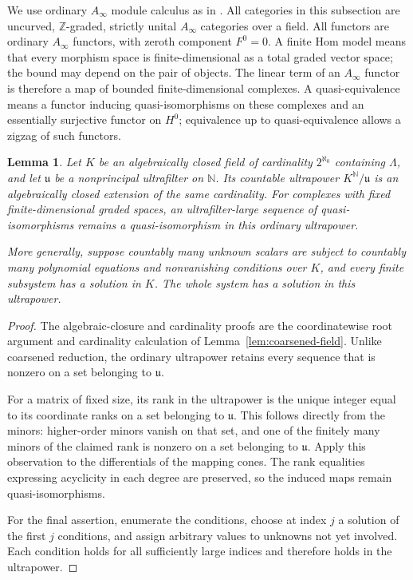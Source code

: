 \documentclass[11pt]{article}
\numberwithin{equation}{section}
\newtheorem{lemma}[theorem]{Lemma}
\theoremstyle{definition}
\theoremstyle{remark}
\newcommand{\Z}{\mathbb Z}
\newcommand{\N}{\mathbb N}
\begin{document}
We use ordinary $A_\infty$ module calculus as in
\cite{HMS:Keller,HMS:SeidelBook}.  All categories in this subsection are uncurved, $\Z$-graded,
strictly unital $A_\infty$ categories over a field.  All functors are
ordinary $A_\infty$ functors, with zeroth component $F^0=0$.
A finite Hom model
means that every morphism space is finite-dimensional as a total graded
vector space; the bound may depend on the pair of objects.  The linear
term of an $A_\infty$ functor is therefore a map of bounded finite-dimensional
complexes.  A quasi-equivalence means a functor inducing quasi-isomorphisms
on these complexes and an essentially surjective functor on $H^0$;
equivalence up to quasi-equivalence allows a zigzag of such functors.

\begin{lemma}\label{lem:field-ordinary-ultrapower}
Let $K$ be an algebraically closed field of cardinality
$2^{\aleph_0}$ containing $\Lambda$, and let $\mathfrak u$ be
a nonprincipal ultrafilter on $\N$.  Its countable ultrapower
$K^{\N}/\mathfrak u$ is an algebraically closed extension of the same
cardinality.  For complexes with fixed finite-dimensional graded
spaces, an ultrafilter-large sequence of quasi-isomorphisms remains
a quasi-isomorphism in this ordinary ultrapower.

More generally, suppose countably many unknown scalars are subject
to countably many polynomial equations and nonvanishing conditions
over $K$, and every finite subsystem has a solution in $K$.  The
whole system has a solution in this ultrapower.
\end{lemma}

\begin{proof}
The algebraic-closure and cardinality proofs are the coordinatewise
root argument and cardinality calculation of
Lemma~\ref{lem:coarsened-field}.  Unlike coarsened reduction, the ordinary
ultrapower retains every sequence that is nonzero on a set belonging
to $\mathfrak u$.

For a matrix of fixed size, its rank in the ultrapower is the unique
integer equal to its coordinate ranks on a set belonging to
$\mathfrak u$.  This follows directly from the minors: higher-order
minors vanish on that set, and one of the finitely many minors of the
claimed rank is nonzero on a set belonging to $\mathfrak u$.  Apply
this observation to the differentials of the mapping cones.  The
rank equalities expressing acyclicity in each degree are preserved,
so the induced maps remain quasi-isomorphisms.

For the final assertion, enumerate the conditions, choose at index
$j$ a solution of the first $j$ conditions, and assign arbitrary
values to unknowns not yet involved.  Each condition holds for all
sufficiently large indices and therefore holds in the ultrapower.
\end{proof}
\end{document}
